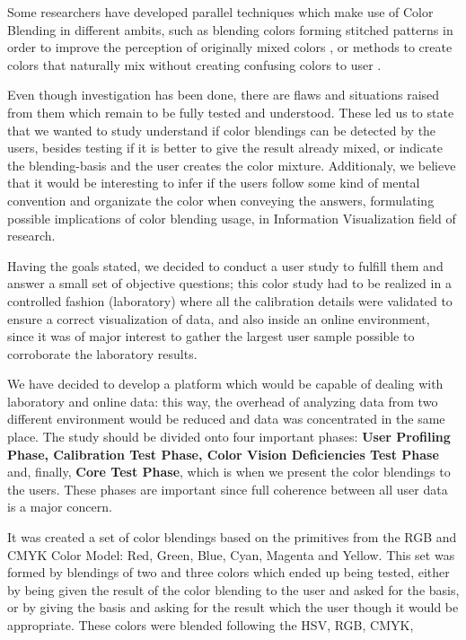%
Some researchers have developed parallel techniques which make use of Color Blending in different
ambits, such as blending colors forming stitched patterns in order to improve the perception of originally mixed
colors \cite{Urness2003}, or methods to create colors that naturally mix without creating confusing colors to user
\cite{Chuang2009}. \par
%
Even though investigation has been done, there are flaws and situations raised from them which remain to be fully
tested and understood. These led us to state that we wanted to study understand if color blendings can be detected
by the users, besides testing if it is better to give the result already mixed, or indicate the blending-basis and
the user creates the color mixture. Additionaly, we believe that it would be interesting to infer if the users follow
some kind of mental convention and organizate the color when conveying the answers, formulating possible implications
of color blending usage, in Information Visualization field of research. \par
%
Having the goals stated, we decided to conduct a user study to fulfill them and answer a small set of objective
questions; this color study had to be realized in a controlled fashion (laboratory) where all the calibration
details were validated to ensure a correct visualization of data, and also inside an online environment, since it
was of major interest to gather the largest user sample possible to corroborate the laboratory results. \par
%
We have decided to develop a platform which would be capable of dealing with laboratory and online data: this way,
the overhead of analyzing data from two different environment would be reduced and data was concentrated in the same
place. The study should be divided onto four important phases: \textbf{User Profiling Phase, Calibration Test Phase,
Color Vision Deficiencies Test Phase} and, finally, \textbf{Core Test Phase}, which is when we present the color
blendings to the users. These phases are important since full coherence between all user data is a major concern. \par
%
It was created a set of color blendings based on the primitives from the RGB and CMYK Color Model: Red, Green, Blue,
Cyan, Magenta and Yellow. This set was formed by blendings of two and three colors which ended up being tested, either
by being given the result of the color blending to the user and asked for the basis, or by giving the basis and asking
for the result which the user though it would be appropriate. These colors were blended following the HSV, RGB, CMYK,
